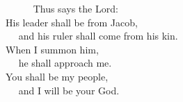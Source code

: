 
\lettrine{ }{}     Thus says the Lord:\\
His leader shall be from Jacob,\\
   and his ruler shall come from his kin.\\
When I summon him,\\
   he shall approach me.\\
You shall be my people,\\
   and I will be your God.